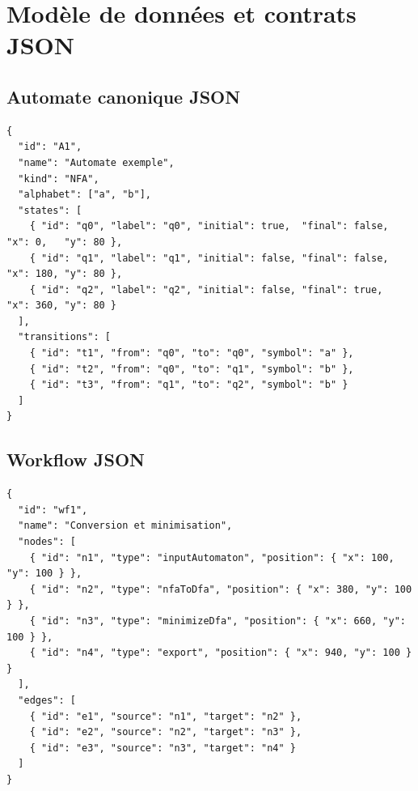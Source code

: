 \documentclass[11pt,a4paper]{report}
\begin{document}
\chapter{Modèle de données et contrats JSON}

\section{Automate canonique JSON}
\begin{lstlisting}
{
  "id": "A1",
  "name": "Automate exemple",
  "kind": "NFA",
  "alphabet": ["a", "b"],
  "states": [
    { "id": "q0", "label": "q0", "initial": true,  "final": false, "x": 0,   "y": 80 },
    { "id": "q1", "label": "q1", "initial": false, "final": false, "x": 180, "y": 80 },
    { "id": "q2", "label": "q2", "initial": false, "final": true,  "x": 360, "y": 80 }
  ],
  "transitions": [
    { "id": "t1", "from": "q0", "to": "q0", "symbol": "a" },
    { "id": "t2", "from": "q0", "to": "q1", "symbol": "b" },
    { "id": "t3", "from": "q1", "to": "q2", "symbol": "b" }
  ]
}
\end{lstlisting}

\section{Workflow JSON}
\begin{lstlisting}
{
  "id": "wf1",
  "name": "Conversion et minimisation",
  "nodes": [
    { "id": "n1", "type": "inputAutomaton", "position": { "x": 100, "y": 100 } },
    { "id": "n2", "type": "nfaToDfa", "position": { "x": 380, "y": 100 } },
    { "id": "n3", "type": "minimizeDfa", "position": { "x": 660, "y": 100 } },
    { "id": "n4", "type": "export", "position": { "x": 940, "y": 100 } }
  ],
  "edges": [
    { "id": "e1", "source": "n1", "target": "n2" },
    { "id": "e2", "source": "n2", "target": "n3" },
    { "id": "e3", "source": "n3", "target": "n4" }
  ]
}
\end{lstlisting}
\end{document}
